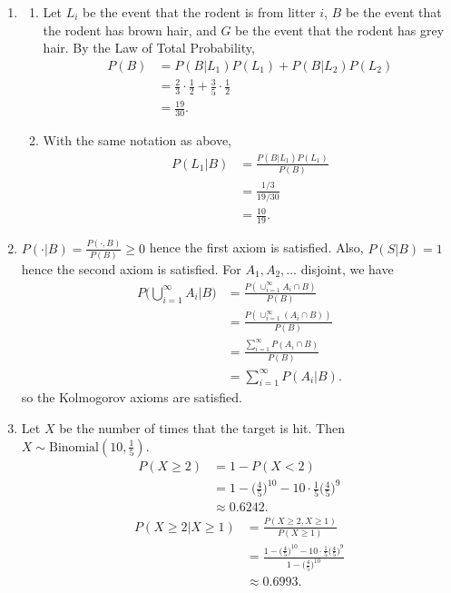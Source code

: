 \documentclass{article}
\begin{document}
\begin{enumerate}
    \item \begin{enumerate}
        \item Let $L_i$ be the event that the rodent is from litter $i$, $B$ be the event
        that the rodent has brown hair, and $G$ be the event that the rodent has grey hair.
        By the Law of Total Probability,
        \begin{align*}
            P(B)
            &= P(B|L_1)P(L_1) + P(B|L_2)P(L_2) \\
            &= \frac{2}{3} \cdot \frac{1}{2} + \frac{3}{5} \cdot \frac{1}{2} \\
            &= \frac{19}{30}.
        \end{align*}

        \item With the same notation as above,
        \begin{align*}
            P(L_1|B)
            &= \frac{P(B|L_1)P(L_1)}{P(B)} \\
            &= \frac{1/3}{19/30} \\
            &= \frac{10}{19}.
        \end{align*}
    \end{enumerate}

    \item $P(\cdot|B) = \frac{P(\cdot, B)}{P(B)} \geq 0$ hence the first axiom is satisfied.
    Also, $P(S|B) = 1$ hence the second axiom is satisfied. For $A_1, A_2, \dots$ disjoint,
    we have
    \begin{align*}
        P\Big( \bigcup_{i = 1}^{\infty} A_i \Big| B \Big)
        &= \frac{P(\cup_{i = 1}^{\infty} A_i \cap B)}{P(B)} \\
        &= \frac{P(\cup_{i = 1}^{\infty} (A_i \cap B))}{P(B)} \\
        &= \frac{\sum_{i = 1}^{\infty} P(A_i \cap B)}{P(B)} \\
        &= \sum_{i = 1}^{\infty} P(A_i | B).
    \end{align*}
    so the Kolmogorov axioms are satisfied.

    \item Let $X$ be the number of times that the target is hit. Then
    $X \sim \text{Binomial}(10, \frac{1}{5})$.
    \begin{align*}
        P(X \geq 2)
        &= 1 - P(X < 2) \\
        &= 1 - \Big( \frac{4}{5} \Big)^{10} - 10\cdot \frac{1}{5} \Big( \frac{4}{5} \Big)^{9} \\
        &\approx 0.6242.
    \end{align*}
    \begin{align*}
        P(X \geq 2|X \geq 1)
        &= \frac{P(X \geq 2, X \geq 1)}{P(X \geq 1)} \\
        &= \frac
        {1 - \Big( \frac{4}{5} \Big)^{10} - 10\cdot \frac{1}{5} \Big( \frac{4}{5} \Big)^{9}}
        {1 - \Big( \frac{4}{5} \Big)^{10}} \\
        &\approx 0.6993.
    \end{align*}


\end{enumerate}
\end{document}
